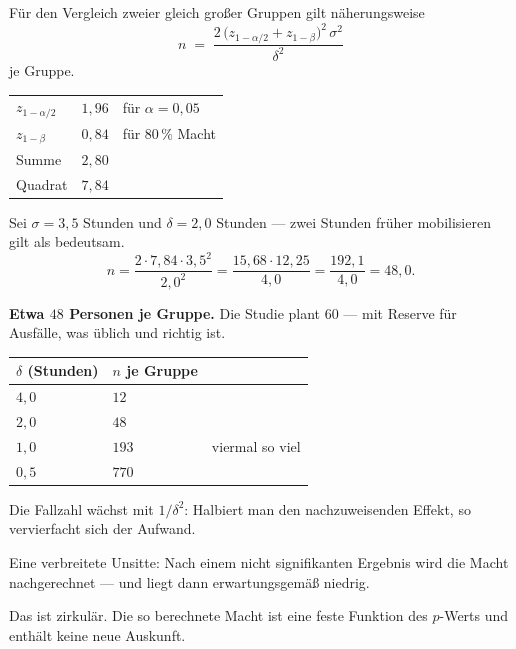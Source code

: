 \begin{merksatz}
Für den Vergleich zweier gleich großer Gruppen gilt näherungsweise
\[ n \;=\; \frac{2\,\bigl(z_{1-\alpha/2} + z_{1-\beta}\bigr)^2\,\sigma^2}{\delta^2} \]
je Gruppe.

\begin{center}
\renewcommand{\arraystretch}{1.45}
\begin{tabular}{@{}P{2.6cm}P{2.0cm}P{3.4cm}@{}}
\toprule
$z_{1-\alpha/2}$ & $1{,}96$ & für $\alpha = 0{,}05$\\
$z_{1-\beta}$ & $0{,}84$ & für $80\,\%$ Macht\\
Summe & $2{,}80$ & \\
Quadrat & $7{,}84$ & \\
\bottomrule
\end{tabular}
\end{center}

Sei $\sigma = 3{,}5$ Stunden und $\delta = 2{,}0$ Stunden --- zwei Stunden früher mobilisieren gilt als bedeutsam.
\[ n = \frac{2 \cdot 7{,}84 \cdot 3{,}5^2}{2{,}0^2} = \frac{15{,}68 \cdot 12{,}25}{4{,}0} = \frac{192{,}1}{4{,}0} = 48{,}0 . \]

\textbf{Etwa $48$ Personen je Gruppe.} Die Studie plant $60$ --- mit Reserve für Ausfälle, was üblich und richtig ist.

\begin{center}
\renewcommand{\arraystretch}{1.48}
\begin{tabular}{@{}P{2.4cm}P{2.2cm}P{2.8cm}@{}}
\toprule
$\delta$ (Stunden) & $n$ je Gruppe & \\
\midrule
$4{,}0$ & $12$ & \\
$2{,}0$ & $48$ & \\
$1{,}0$ & $193$ & \textcolor{akzent}{viermal so viel}\\
$0{,}5$ & $770$ & \\
\bottomrule
\end{tabular}
\end{center}

Die Fallzahl wächst mit $1/\delta^2$: Halbiert man den nachzuweisenden Effekt, so vervierfacht sich der Aufwand.
\end{merksatz}

\begin{warnung}
Eine verbreitete Unsitte: Nach einem nicht signifikanten Ergebnis wird die Macht  nachgerechnet --- und liegt dann erwartungsgemäß niedrig.

Das ist zirkulär. Die so berechnete Macht ist eine feste Funktion des $p$-Werts und enthält keine neue Auskunft.

\begin{center}
\begin{minipage}{0.88\textwidth}
\end{minipage}
\end{center}
\end{warnung}

